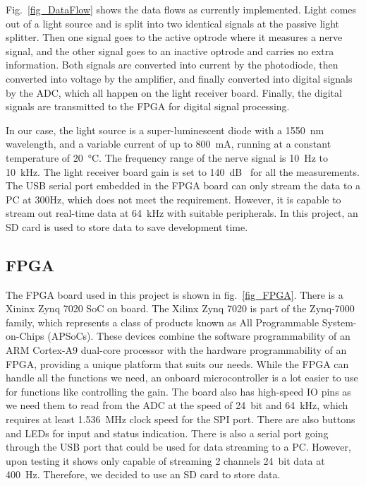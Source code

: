 Fig.~\ref{fig_DataFlow} shows the data flows as currently implemented.  Light comes out of a light source and is split into two identical signals at the passive light splitter.  Then one signal goes to the active optrode where it measures a nerve signal, and the other signal goes to an inactive optrode and carries no extra information.  Both signals are converted into current by the photodiode, then converted into voltage by the amplifier, and finally converted into digital signals by the ADC, which all happen on the light receiver board.  Finally, the digital signals are transmitted to the FPGA for digital signal processing.

In our case, the light source is a super-luminescent diode with a \qty{1550}{\nm} wavelength, and a variable current of up to \qty{800}{\mA}, running at a constant temperature of \qty{20}{\degreeCelsius}.  The frequency range of the nerve signal is \qty{10}{\Hz} to \qty{10}{\kHz}.  The light receiver board gain is set to \qty{140}{dB\Omega} for all the measurements.  The USB serial port embedded in the FPGA board can only stream the data to a PC at 300Hz, which does not meet the requirement.  However, it is capable to stream out real-time data at \qty{64}{kHz} with suitable peripherals.  In this project, an SD card is used to store data to save development time.

\subsection{FPGA}

The FPGA board used in this project is shown in fig.~\ref{fig_FPGA}.  There is a Xininx Zynq 7020 SoC on board.  The Xilinx Zynq 7020 is part of the Zynq-7000 family, which represents a class of products known as All Programmable System-on-Chips (APSoCs). These devices combine the software programmability of an ARM Cortex-A9 dual-core processor with the hardware programmability of an FPGA, providing a unique platform that suits our needs.  While the FPGA can handle all the functions we need, an onboard microcontroller is a lot easier to use for functions like controlling the gain.  The board also has high-speed IO pins as we need them to read from the ADC at the speed of \qty{24}{bit} and \qty{64}{kHz}, which requires at least \qty{1.536}{MHz} clock speed for the SPI port.  There are also buttons and LEDs for input and status indication.  There is also a serial port going through the USB port that could be used for data streaming to a PC.  However, upon testing it shows only capable of streaming 2 channels \qty{24}{bit} data at \qty{400}{Hz}.  Therefore, we decided to use an SD card to store data.

